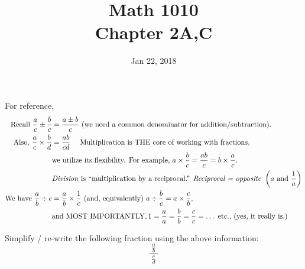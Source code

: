 \documentclass[12pt]{article}
\begin{document}
\title{\bf Math 1010 \\ Chapter 2A,C}
\date{Jan 22, 2018}
\maketitle






For reference, 
\begin{equation*}
\begin{split}
\text{Recall } \frac{a}{c} \pm \frac{b}{c} &= \frac{a\pm b}{c} \text{ (we need a common denominator for addition/subtraction)}.\\
\text{Also, } \frac{a}{c} \times \frac{b}{d} &= \frac{ab}{cd} \quad \text{ Multiplication is THE core of working with fractions}, \\
&\text{we utilize its flexibility. For example, } a \times \frac{b}{c} = \frac{ab}{c} = b \times \frac{a}{c} .\\
&\text{\emph{Division} is ``multiplication by a reciprocal.'' \emph{Reciprocal = opposite }} \left ( a \text{ and } \frac{1}{a} \right )\\
\text{We have } \frac{a}{b} \div c &= \frac{a}{b} \times \frac{1}{c} \text{ (and, equivalently) } a \div \frac{b}{c} = a \times \frac{c}{b}, \\
& \text{and MOST IMPORTANTLY}, 1 = \frac{a}{a} = \frac{b}{b} = \frac{c}{c} = \dots \text{ etc., (yes, it really is.) }
\end{split}
\end{equation*}
\vspace{.5in}

Simplify / re-write the following fraction using the above information: \\

\begin{equation*}
\frac{\; \frac{a}{b} \;}{\frac{c}{d}}
\end{equation*}
\pagebreak
\end{document}

